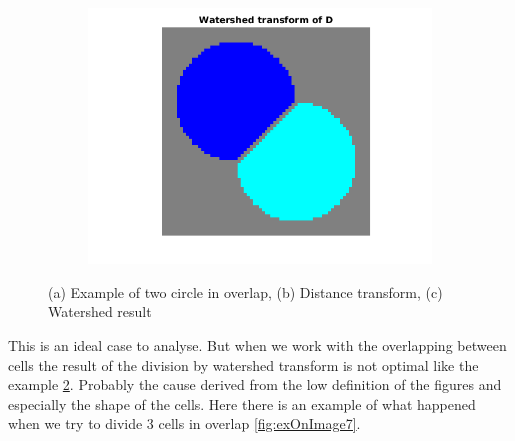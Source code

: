 \begin{figure}[htbp]
\begin{subfigure}[b]{0.5\textwidth}
        \includegraphics[width=\textwidth]{img/watershedEx.png}
        \caption{ }
        \label{fig:overlapwater}
    \end{subfigure}
    \caption{(a) Example of two circle in overlap, (b) Distance transform, (c) Watershed result}\label{fig:stepswater}
\end{figure}
This is an ideal case to analyse. But when we work with the overlapping between cells the result of the division by watershed transform is not optimal like the example \ref{fig:stepswater}. Probably the cause derived from the low definition of the figures and especially the shape of the cells. Here there is an example of what happened when we try to divide 3 cells in overlap \ref{fig:exOnImage7}.
